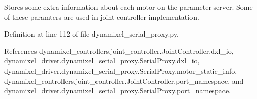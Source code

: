 \begin{DoxyVerb}Stores some extra information about each motor on the parameter server.
Some of these paramters are used in joint controller implementation.
\end{DoxyVerb}
 

Definition at line 112 of file dynamixel\+\_\+serial\+\_\+proxy.\+py.



References dynamixel\+\_\+controllers.\+joint\+\_\+controller.\+Joint\+Controller.\+dxl\+\_\+io, dynamixel\+\_\+driver.\+dynamixel\+\_\+serial\+\_\+proxy.\+Serial\+Proxy.\+dxl\+\_\+io, dynamixel\+\_\+driver.\+dynamixel\+\_\+serial\+\_\+proxy.\+Serial\+Proxy.\+motor\+\_\+static\+\_\+info, dynamixel\+\_\+controllers.\+joint\+\_\+controller.\+Joint\+Controller.\+port\+\_\+namespace, and dynamixel\+\_\+driver.\+dynamixel\+\_\+serial\+\_\+proxy.\+Serial\+Proxy.\+port\+\_\+namespace.


